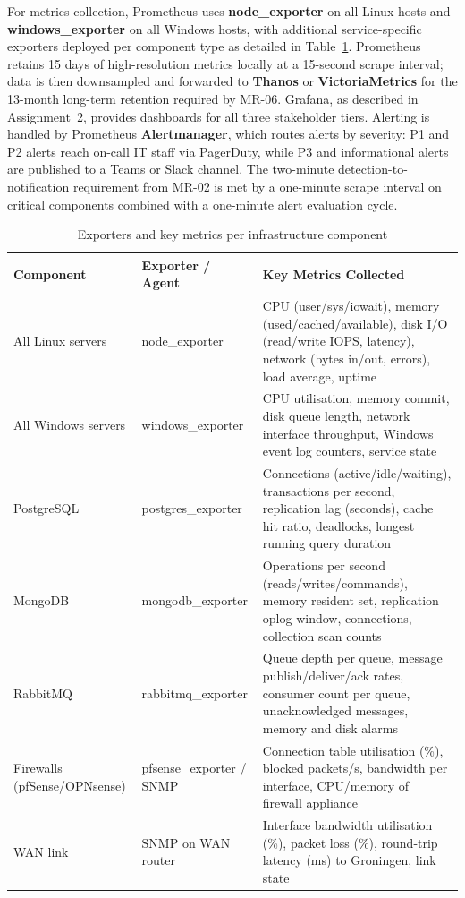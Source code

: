 For metrics collection, Prometheus uses \textbf{node\_exporter} on all Linux hosts and \textbf{windows\_exporter} on all Windows hosts, with additional service-specific exporters deployed per component type as detailed in Table~\ref{tab:exporters}. Prometheus retains 15 days of high-resolution metrics locally at a 15-second scrape interval; data is then downsampled and forwarded to \textbf{Thanos} or \textbf{VictoriaMetrics} for the 13-month long-term retention required by MR-06. Grafana, as described in Assignment~2, provides dashboards for all three stakeholder tiers. Alerting is handled by Prometheus \textbf{Alertmanager}, which routes alerts by severity: P1 and P2 alerts reach on-call IT staff via PagerDuty, while P3 and informational alerts are published to a Teams or Slack channel. The two-minute detection-to-notification requirement from MR-02 is met by a one-minute scrape interval on critical components combined with a one-minute alert evaluation cycle.

\begin{table}[H]
\centering
\begin{tabularx}{\textwidth}{llX}
\toprule
\textbf{Component} & \textbf{Exporter / Agent} & \textbf{Key Metrics Collected} \\
\midrule
All Linux servers & node\_exporter & CPU (user/sys/iowait), memory (used/cached/available), disk I/O (read/write IOPS, latency), network (bytes in/out, errors), load average, uptime \\
All Windows servers & windows\_exporter & CPU utilisation, memory commit, disk queue length, network interface throughput, Windows event log counters, service state \\
PostgreSQL & postgres\_exporter & Connections (active/idle/waiting), transactions per second, replication lag (seconds), cache hit ratio, deadlocks, longest running query duration \\
MongoDB & mongodb\_exporter & Operations per second (reads/writes/commands), memory resident set, replication oplog window, connections, collection scan counts \\
RabbitMQ & rabbitmq\_exporter & Queue depth per queue, message publish/deliver/ack rates, consumer count per queue, unacknowledged messages, memory and disk alarms \\
Firewalls (pfSense/OPNsense) & pfsense\_exporter / SNMP & Connection table utilisation (\%), blocked packets/s, bandwidth per interface, CPU/memory of firewall appliance \\
WAN link & SNMP on WAN router & Interface bandwidth utilisation (\%), packet loss (\%), round-trip latency (ms) to Groningen, link state \\
\bottomrule
\end{tabularx}
\caption{Exporters and key metrics per infrastructure component}
\label{tab:exporters}
\end{table}

